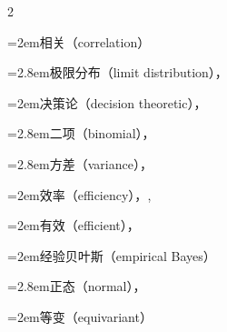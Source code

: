 \begin{multicols}{2}
\par\noindent\hangindent=2em\hspace*{1em}\label{idx:774}相关（correlation）\par
\par\noindent\hangindent=2.8em\hspace*{1.8em}\label{idx:775}极限分布（limit distribution），\hyperref[item:10.17.d]{\pageref*{item:10.17.d}}\par
\par\noindent\hangindent=2em\hspace*{1em}\label{idx:776}决策论（decision theoretic），\hyperref[ex:7.3.28]{\pageref*{ex:7.3.28}}\par
\par\noindent\hangindent=2.8em\hspace*{1.8em}\label{idx:777}二项（binomial），\hyperref[ex:7.3.30]{\pageref*{ex:7.3.30}}\par
\par\noindent\hangindent=2.8em\hspace*{1.8em}\label{idx:778}方差（variance），\hyperref[ex:7.3.26]{\pageref*{ex:7.3.26}}\par
\par\noindent\hangindent=2em\hspace*{1em}\label{idx:779}效率（efficiency），\hyperref[sec:10.1.2]{\pageref*{sec:10.1.2}}, \hyperref[def:10.1.11]{\pageref*{def:10.1.11}}\par
\par\noindent\hangindent=2em\hspace*{1em}\label{idx:780}有效（efficient），\hyperref[idxocc:780:415]{\pageref*{idxocc:780:415}}\par
{}
\par\noindent\hangindent=2em\hspace*{1em}\label{idx:781}经验贝叶斯（empirical Bayes）\par
\par\noindent\hangindent=2.8em\hspace*{1.8em}\label{idx:782}正态（normal），\hyperref[exercise:7.25]{\pageref*{exercise:7.25}}\par
{}
\par\noindent\hangindent=2em\hspace*{1em}\label{idx:783}等变（equivariant）\par

\end{multicols}
